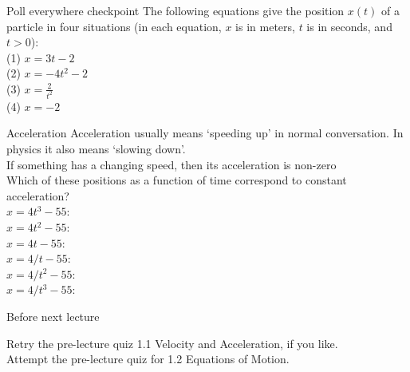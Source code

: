  
  \begin{frame}{Poll everywhere checkpoint }
  \small
The following equations give the position $x(t)$ of a particle in four situations (in each equation, $x$ is in meters, $t$ is in seconds, and $t > 0$):\\[2ex]

 (1) $x = 3t - 2$\\[1ex]
 (2) $x = -4t^2 - 2$\\[1ex]
 (3) $x = \frac{2}{t^2}$\\[1ex]
 (4) $x = -2$ \\[3ex]
 
\vspace{2cm}
 
 
 \end{frame}
 
\begin{frame}{Acceleration}
\small
Acceleration usually means `speeding up' in normal conversation. In physics it also means `slowing down'.\\[1ex]

If something has a changing speed, then its acceleration is non-zero\\[1ex]

Which of these positions as a function of time correspond to constant acceleration?\\[1ex]
$x = 4t^3 - 55$:\\[1ex]
$x = 4t^2 - 55$:\\[1ex]
$x = 4t - 55$:\\[1ex]
$x = 4/t - 55$:\\[1ex]
$x = 4/t^2 - 55$:\\[1ex]
$x = 4/t^3 - 55$:\\[1ex]
\end{frame}


\begin{frame}{Before next lecture}

Retry the pre-lecture quiz 1.1  Velocity and Acceleration, if you like.\\[1ex]
Attempt the pre-lecture quiz for 1.2  Equations of Motion.\\

\end{frame}

